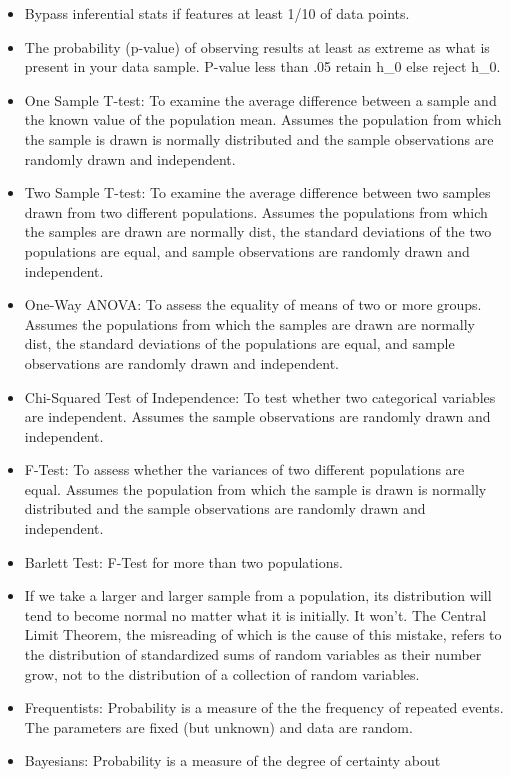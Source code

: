 \documentclass[]{book}
\theoremstyle{definition}
\theoremstyle{definition}
\theoremstyle{definition}
\theoremstyle{remark}
\begin{document}
\begin{itemize}
\item
  Bypass inferential stats if features at least 1/10 of data points.
\item
  The probability (p-value) of observing results at least as extreme as
  what is present in your data sample. P-value less than .05 retain h\_0
  else reject h\_0.
\item
  One Sample T-test: To examine the average difference between a sample
  and the known value of the population mean. Assumes the population
  from which the sample is drawn is normally distributed and the sample
  observations are randomly drawn and independent.
\item
  Two Sample T-test: To examine the average difference between two
  samples drawn from two different populations. Assumes the populations
  from which the samples are drawn are normally dist, the standard
  deviations of the two populations are equal, and sample observations
  are randomly drawn and independent.
\item
  One-Way ANOVA: To assess the equality of means of two or more groups.
  Assumes the populations from which the samples are drawn are normally
  dist, the standard deviations of the populations are equal, and sample
  observations are randomly drawn and independent.
\item
  Chi-Squared Test of Independence: To test whether two categorical
  variables are independent. Assumes the sample observations are
  randomly drawn and independent.
\item
  F-Test: To assess whether the variances of two different populations
  are equal. Assumes the population from which the sample is drawn is
  normally distributed and the sample observations are randomly drawn
  and independent.
\item
  Barlett Test: F-Test for more than two populations.
\item
  If we take a larger and larger sample from a population, its
  distribution will tend to become normal no matter what it is
  initially. It won't. The Central Limit Theorem, the misreading of
  which is the cause of this mistake, refers to the distribution of
  standardized sums of random variables as their number grow, not to the
  distribution of a collection of random variables.
\item
  Frequentists: Probability is a measure of the the frequency of
  repeated events. The parameters are fixed (but unknown) and data are
  random.
\item
  Bayesians: Probability is a measure of the degree of certainty about

\end{itemize}
\end{document}
